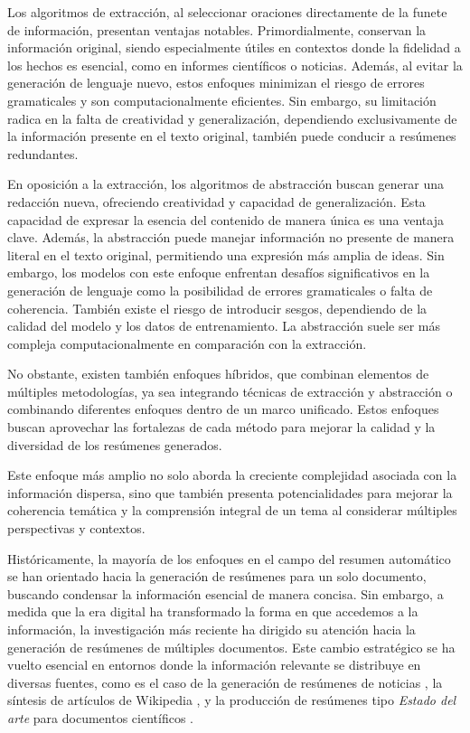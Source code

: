     Los algoritmos de extracción, al seleccionar oraciones directamente de la funete de información, presentan ventajas notables. Primordialmente, conservan la información original, siendo especialmente útiles en contextos donde la fidelidad a los hechos es esencial, como en informes científicos o noticias. Además, al evitar la generación de lenguaje nuevo, estos enfoques minimizan el riesgo de errores gramaticales y son computacionalmente eficientes. Sin embargo, su limitación radica en la falta de creatividad y generalización, dependiendo exclusivamente de la información presente en el texto original, también puede conducir a resúmenes redundantes.

    En oposición a la extracción, los algoritmos de abstracción buscan generar una redacción nueva, ofreciendo creatividad y capacidad de generalización. Esta capacidad de expresar la esencia del contenido de manera única es una ventaja clave. Además, la abstracción puede manejar información no presente de manera literal en el texto original, permitiendo una expresión más amplia de ideas. Sin embargo, los modelos con este enfoque enfrentan desafíos significativos en la generación de lenguaje como la posibilidad de errores gramaticales o falta de coherencia. También existe el riesgo de introducir sesgos, dependiendo de la calidad del modelo y los datos de entrenamiento. La abstracción suele ser más compleja computacionalmente en comparación con la extracción.

    No obstante, existen también enfoques híbridos, que combinan elementos de múltiples metodologías, ya sea integrando técnicas de extracción y abstracción o combinando diferentes enfoques dentro de un marco unificado. Estos enfoques buscan aprovechar las fortalezas de cada método para mejorar la calidad y la diversidad de los resúmenes generados.

    Este enfoque más amplio no solo aborda la creciente complejidad asociada con la información dispersa, sino que también presenta potencialidades para mejorar la coherencia temática y la comprensión integral de un tema al considerar múltiples perspectivas y contextos.

    Históricamente, la mayoría de los enfoques en el campo del resumen automático se han orientado hacia la generación de resúmenes para un solo documento, buscando condensar la información esencial de manera concisa. Sin embargo, a medida que la era digital ha transformado la forma en que accedemos a la información, la investigación más reciente ha dirigido su atención hacia la generación de resúmenes de múltiples documentos. Este cambio estratégico se ha vuelto esencial en entornos donde la información relevante se distribuye en diversas fuentes, como es el caso de la generación de resúmenes de noticias \cite{fabbri2019multi-news}, la síntesis de artículos de Wikipedia \cite{liu2018}, y la producción de resúmenes tipo \emph{Estado del arte} para documentos científicos \cite{lu2020multixscience}.


